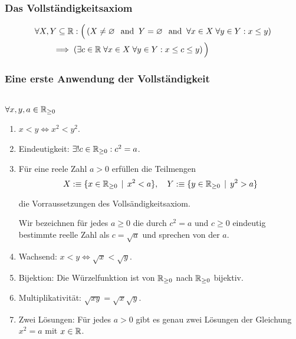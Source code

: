 \subsubsection{Das Vollständigkeitsaxiom}

\[
  \begin{aligned}
    &\forall X,Y \subseteq \mathbb{R}: \Big( \left( X \neq \varnothing \;\;\, \text{and}\;\; Y = \varnothing \;\;\, \text{and}\;\; \forall x \in X \; \forall y \in Y: x \leq y \right) \\
    &\qquad \implies \left(\exists c \in \mathbb{R} \; \forall x \in X \; \forall y \in Y: x \leq c \leq y \right) \Big)
  \end{aligned}
\]

\subsubsection{Eine erste Anwendung der Vollständigkeit}

\begin{imp-ex}
  \phantom{.}\\
  $\forall x,y,a \in \mathbb{R}_{\geq0}$
\begin{enumerate}
  \item $x<y \iff x^2 < y^2$.
  \item Eindeutigkeit: $\exists! c \in \mathbb{R}_{\geq 0}: c^2 = a$.
  \item Für eine reele Zahl $a>0$ erfüllen die Teilmengen \[
  X :\equiv \{x \in \mathbb{R}_{\geq 0} \, \mid \, x^2 < a \}, \quad Y :\equiv \{y \in \mathbb{R}_{\geq 0} \, \mid \, y^2 > a \}
  \]

  die Vorraussetzungen des Vollsändigkeitsaxiom.

\begin{mydef-non}
    Wir bezeichnen für jedes $a \geq 0$ die durch $c^2 = a$ und $c \geq 0$ eindeutig bestimmte reelle Zahl als $c=\sqrt{a}$ und sprechen von der  $a$.
\end{mydef-non}

  \item Wachsend: $x < y \iff \sqrt{x} < \sqrt{y}$.
  \item Bijektion: Die Würzelfunktion ist von $\mathbb{R}_{\geq 0}$ nach $\mathbb{R}_{\geq 0}$ bijektiv.
  \item Multiplikativität: $\sqrt{xy} = \sqrt{x}\sqrt{y}$.
  \item Zwei Lösungen: Für jedes $a>0$ gibt es genau zwei Lösungen der Gleichung $x^2 = a$ mit $x \in \mathbb{R}$.
\end{enumerate}
\end{imp-ex}